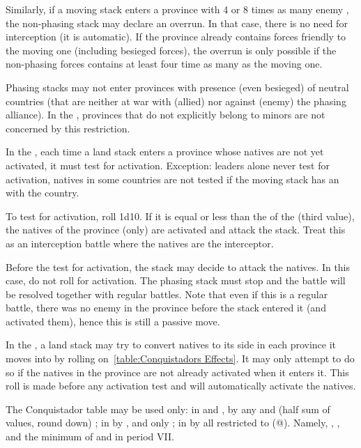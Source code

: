 Similarly, if a moving stack enters a province with 4 or 8 times as many enemy
\LD, the non-phasing stack may declare an overrun. In that case, there is no
need for interception (it is automatic). If the province already contains
forces friendly to the moving one (including besieged forces), the overrun is
only possible if the non-phasing forces contains at least four time as many
\LD as the moving one.

Phasing stacks may not enter provinces with presence (even besieged) of
neutral countries (that are neither at war with (allied) nor against (enemy)
the phasing alliance). In the \ROTW, provinces that do not explicitly belong to
minors are not concerned by this restriction.

In the \ROTW, each time a land stack enters a province whose natives are not
yet activated, it must test for activation. Exception: leaders alone never
test for activation, natives in some \ROTW countries are not tested if the
moving stack has an \dipAT with the country.

To test for activation, roll 1d10. If it is equal or less than the
 of the \Area (third value), the natives of the province
(only) are activated and attack the stack. Treat this as an interception
battle where the natives are the interceptor.

Before the test for activation, the stack may decide to attack the natives. In
this case, do not roll for activation. The phasing stack must stop and the
battle will be resolved together with regular battles. Note that even if this
is a regular battle, there was no enemy in the province before the stack
entered it (and activated them), hence this is still a passive move.

In the \ROTW, a land stack may try to convert natives to its side in each
province it moves into by rolling on~\ref{table:Conquistadors Effects}. It may
only attempt to do so if the natives in the province are not already activated
when it enters it. This roll is made before any activation test and will
automatically activate the natives.


The Conquistador table may be used only:
\bparag in  and , by any \LeaderC and
\LeaderE (half sum of values, round down) ;
\bparag in  by ,  and
 only ;
\bparag in  by all \LeaderC restricted to 
(@). Namely, , ,  and the minimum
\LeaderC@ of \FRA and \ANG in period VII.

